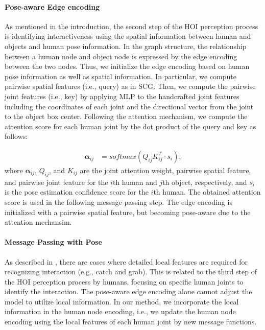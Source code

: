 \documentclass[10pt,twocolumn,letterpaper]{article}
\begin{document}
 \paragraph{Pose-aware Edge encoding}
 As mentioned in the introduction, the second step of the HOI perception process is identifying interactiveness using the spatial information between human and objects and human pose information. In the graph structure, the relationship between a human node and object node is expressed by the edge encoding between the two nodes. Thus, we initialize the edge encoding based on human pose information as well as spatial information. In particular, we compute pairwise spatial features (i.e., query) as in SCG. Then, we compute the pairwise joint features (i.e., key) by applying MLP to the handcrafted joint features including the coordinates of each joint and the directional vector from the joint to the object box center. Following the attention mechanism, we compute the attention score for each human joint by the dot product of the query and key as follows:

\begin{align}
    \label{eq:4}
    \boldsymbol{\alpha}_{ij} &= softmax(Q_{ij}K_{ij}^{T} \cdot s_{i}),
\end{align}
where $\boldsymbol{\alpha}_{ij}$, $Q_{ij}$, and $K_{ij}$ are the joint attention weight, pairwise spatial feature, and pairwise joint feature for the $i$th human and $j$th object, respectively, and $s_{i}$ is the pose estimation confidence score for the $i$th human. The obtained attention score is used in the following message passing step. The edge encoding is initialized with a pairwise spatial feature, but becoming pose-aware due to the attention mechansim. 



\paragraph {Message Passing with Pose}
As described in \cite{wan2019pose}, there are cases where detailed local features are required for recognizing interaction (e.g., catch and grab). This is related to the third step of the HOI perception process by humans, focusing on specific human joints to identify the interaction. The pose-aware edge encoding alone cannot adjust the model to utilize local information. In our method, we incorporate the local information in the human node encoding, i.e., we update the human node encoding using the local features of each human joint by new message functions. 
\end{document}
